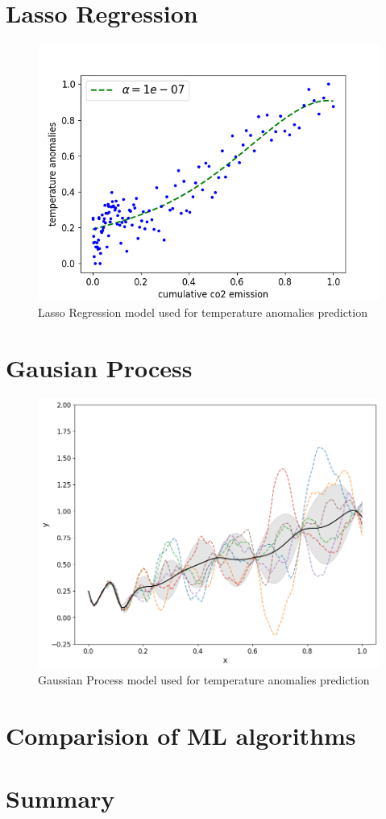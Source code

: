\newpage
\section{Lasso Regression}

\begin{figure}[h]
  \includegraphics[width=\linewidth]{img/lasso-regression.png}
  \caption{Lasso Regression model used for temperature anomalies prediction}
  \label{fig:lasso-regression}
\end{figure}

\newpage
\section{Gausian Process}

\begin{figure}[h]
  \includegraphics[width=\linewidth]{img/gaussian-process.png}
  \caption{Gaussian Process model used for temperature anomalies prediction}
  \label{fig:gaussian-process}
\end{figure}

\section{Comparision of ML algorithms}

\section{Summary}
